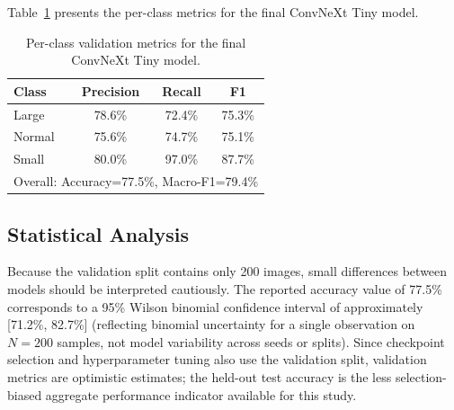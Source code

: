 \documentclass[10pt,twocolumn,letterpaper]{article}
\newcommand{\BestAccuracy}{77.5\%}
\newcommand{\BestAccuracyCI}{[71.2\%, 82.7\%]}
\newcommand{\BestMacroFOne}{79.4\%}
\newcommand{\BestLargePrec}{78.6\%}
\newcommand{\BestLargeRec}{72.4\%}
\newcommand{\BestLargeFOne}{75.3\%}
\newcommand{\BestNormalPrec}{75.6\%}
\newcommand{\BestNormalRec}{74.7\%}
\newcommand{\BestNormalFOne}{75.1\%}
\newcommand{\BestSmallPrec}{80.0\%}
\newcommand{\BestSmallRec}{97.0\%}
\newcommand{\BestSmallFOne}{87.7\%}
\begin{document}
Table~\ref{tab:perclass} presents the per-class metrics for the final ConvNeXt Tiny model.

\begin{table}[h]
\small
\centering
\caption{Per-class validation metrics for the final ConvNeXt Tiny model.}
\label{tab:perclass}
\begin{tabular}{lccc}
\toprule
Class & Precision & Recall & F1 \\
\midrule
Large  & \BestLargePrec & \BestLargeRec & \BestLargeFOne \\
Normal & \BestNormalPrec & \BestNormalRec & \BestNormalFOne \\
Small  & \BestSmallPrec & \BestSmallRec & \BestSmallFOne \\
\midrule
\multicolumn{4}{l}{Overall: Accuracy=\BestAccuracy, Macro-F1=\BestMacroFOne} \\
\bottomrule
\end{tabular}
\end{table}

\subsection{Statistical Analysis}

Because the validation split contains only 200 images, small differences between models should be interpreted cautiously. The reported accuracy value of \BestAccuracy{} corresponds to a 95\% Wilson binomial confidence interval of approximately \BestAccuracyCI{} (reflecting binomial uncertainty for a single observation on $N=200$ samples, not model variability across seeds or splits). Since checkpoint selection and hyperparameter tuning also use the validation split, validation metrics are optimistic estimates; the held-out test accuracy is the less selection-biased aggregate performance indicator available for this study.
\end{document}

